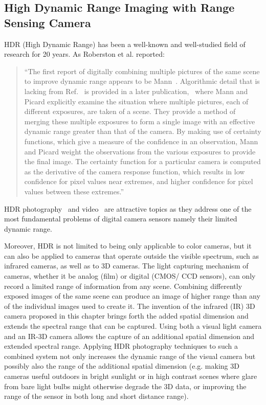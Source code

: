 \subsection{High Dynamic Range Imaging with Range Sensing Camera}
HDR (High Dynamic Range) has been a well-known and well-studied field of
research for 20 years.  As Roberston et al. reported:
\begin{quote}
``The first report of digitally combining multiple pictures
 of the same scene to improve dynamic range appears to be
 Mann~\cite{mannist}.
 Algorithmic detail that is lacking from Ref.~\cite{mannist} is
 provided in a later publication,~\cite{mannwyckofftr}
 where Mann and Picard explicitly examine the situation where multiple pictures,
 each of different exposures, are taken of a scene. They
 provide a method of merging these multiple exposures to
 form a single image with an effective dynamic range
 greater than that of the camera. By making use of certainty
 functions, which give a measure of the confidence in an
 observation, Mann and Picard weight the observations from
 the various exposures to provide the final image. The certainty
 function for a particular camera is computed as the
 derivative of the camera response function, which results in
 low confidence for pixel values near extremes, and higher
 confidence for pixel values
 between these extremes.''~\cite{robertson2003estimation}
\end{quote}

HDR photography~\cite{candocia1, candocia2, candocia3, wyckoff1962experimental, 
mannist} and video~\cite{mann2012hdrchitecture,lo2012high,mann2012realtime, 
HDRVideoCamera11, kang2003high} are attractive topics as they address one of the most 
fundamental problems of digital camera sensors namely their limited dynamic range.

Moreover, HDR is not limited to being only applicable to color cameras, but it can also be applied to 
cameras that operate outside the visible spectrum, such as infrared cameras, as well as to 3D 
cameras.  The light capturing mechanism of cameras, whether it be analog (film) or digital (CMOS/
CCD sensors), can only record a limited range of information from any scene. Combining 
differently exposed images of the same scene can produce an image of higher range than any of 
the individual images used to create it. The invention of the infrared (IR) 3D camera proposed in 
this chapter brings forth the added spatial dimension and extends the spectral range that can be 
captured. Using both a visual light camera and an IR-3D camera allows the capture of an additional 
spatial dimension and extended spectral range. Applying HDR photography techniques to such a 
combined system not only increases the dynamic range of the visual camera but possibly also the 
range of the additional spatial dimension (e.g. making 3D cameras useful outdoors in bright 
sunlight or in high contrast scenes where glare from bare light bulbs might otherwise degrade the 
3D data, or improving the range of the sensor in both long and short distance range).

